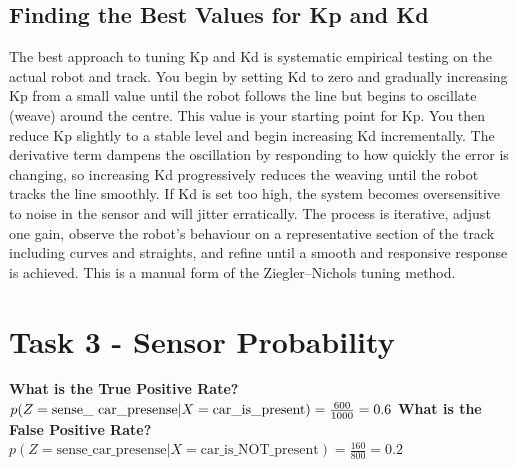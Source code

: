 \documentclass[11 pt , a 4 paper ]{article}
\theoremstyle{definition}
\begin{document}
  \subsection*{Finding the Best Values for Kp and Kd}
  The best approach to tuning Kp and Kd is systematic empirical testing on the actual robot and track. You begin by setting Kd to zero and gradually increasing Kp from a small value until the robot follows the line but begins to oscillate (weave) around the centre. This value is your starting point for Kp. You then reduce Kp slightly to a stable level and begin increasing Kd incrementally. The derivative term dampens the oscillation by responding to how quickly the error is changing, so increasing Kd progressively reduces the weaving until the robot tracks the line smoothly. If Kd is set too high, the system becomes oversensitive to noise in the sensor and will jitter erratically. The process is iterative, adjust one gain, observe the robot's behaviour on a representative section of the track including curves and straights, and refine until a smooth and responsive response is achieved. This is a manual form of the Ziegler–Nichols tuning method.
  \section*{Task 3 - Sensor Probability}
  
  \textbf{What is the True Positive Rate?}\\
  $p( Z = \text{sense\_ car\_presense}| X = \text{car\_is\_present})=\frac{600}{1000}=0.6\\$
  \textbf{What is the False Positive Rate?}\\
  $p(Z=\text{sense\_car\_presense} | X=\text{car\_is\_NOT\_present})=\frac{160}{800}=0.2$

  
\end{document}
